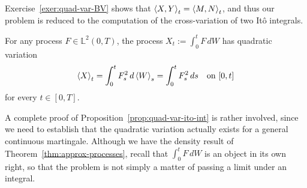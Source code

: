 Exercise~\ref{exer:quad-var-BV} shows that $\braket{X,Y}_t = \braket{M,N}_t$, and thus our problem is reduced to the computation of the cross-variation of two It\^{o} integrals.
\begin{proposition}
\label{prop:quad-var-ito-int}
    For any process $F\in\mathbb{L}^2(0,T)$, the process $X_t:=\int_0^t F\,dW$ has quadratic variation
    \begin{equation}
    \label{eq:quad-var-ito-int}
        \braket{X}_t = \int_0^t F_s^2\,d\braket{W}_s = \int_0^t F_s^2\,ds \quad\text{on } [0,t]
    \end{equation}
    for every $t\in [0,T]$.
\end{proposition}

A complete proof of Proposition~\ref{prop:quad-var-ito-int} is rather involved, since we need to establish that the quadratic variation actually exists for a general continuous martingale. Although we have the density result of Theorem~\ref{thm:approx-processes}, recall that $\int_0^t F\,dW$ is an object in its own right, so that the problem is not simply a matter of passing a limit under an integral.

